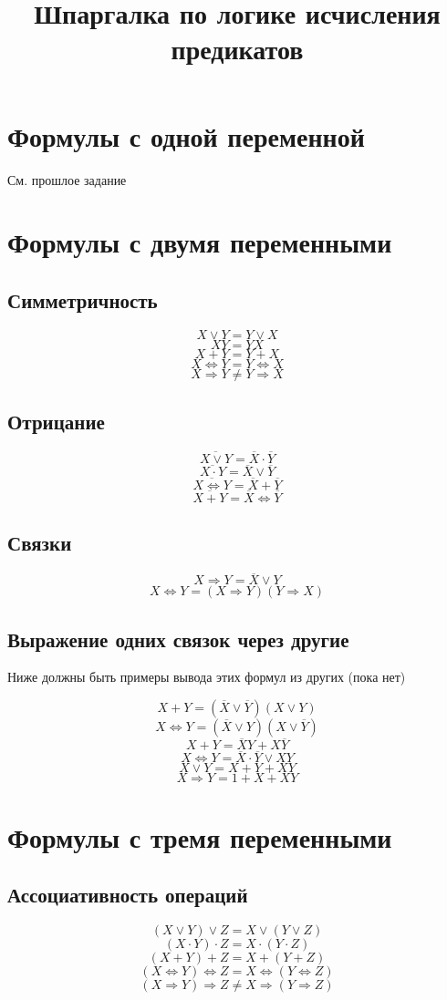\documentclass{article}
\title{Шпаргалка по логике исчисления предикатов}
\author{}
\date{}
\numberwithin{equation}{subsection}
\renewcommand{\[}{\begin{equation}}
\renewcommand{\]}{\end{equation}}
\begin{document}
\section{Формулы с одной переменной}

См. прошлое задание

\section{Формулы с двумя переменными}

\subsection{Симметричность}
\[X \vee Y = Y \vee X\]
\[XY = YX\]
\[X + Y = Y + X\]
\[X \Leftrightarrow Y = Y \Leftrightarrow X\]
\[X \Rightarrow Y \ne Y \Rightarrow X\]

\subsection{Отрицание}
\[\overline{X\vee Y} = \overline{X}\cdot\overline{Y}\]
\[\overline{X\cdot Y} = \overline{X}\vee\overline{Y}\]
\[\overline{X\Leftrightarrow Y} = \overline{X}+\overline{Y}\]
\[\overline{X + Y} = \overline{X}\Leftrightarrow\overline{Y}\]

\subsection{Связки}
\[X\Rightarrow Y = \overline{X} \vee Y \]
\[X\Leftrightarrow Y = (X\Rightarrow Y)(Y\Rightarrow X)\]

\subsection{Выражение одних связок через другие}

Ниже должны быть примеры вывода этих формул из других (пока нет)

\[X + Y = (\overline{X} \vee \overline{Y})(X \vee Y)\]
\[X \Leftrightarrow Y = (\overline{X} \vee Y)(X \vee \overline{Y})\]
\[X + Y = \overline{X}Y + X\overline{Y}\]
\[X \Leftrightarrow Y = \overline{X}\cdot\overline{Y} \vee XY\]
\[X \vee Y = X + Y + XY\]
\[X \Rightarrow Y = 1 + X + XY\]

\section{Формулы с тремя переменными}
\subsection{Ассоциативность операций}
\[(X \vee Y) \vee Z = X \vee (Y \vee Z)\]
\[(X \cdot Y) \cdot Z = X \cdot (Y \cdot Z)\]
\[(X + Y) + Z = X + (Y + Z)\]
\[(X \Leftrightarrow Y) \Leftrightarrow Z = X \Leftrightarrow (Y \Leftrightarrow Z)\]
\[(X \Rightarrow Y) \Rightarrow Z \ne X \Rightarrow (Y \Rightarrow Z)\]
\end{document}
